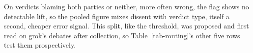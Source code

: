 On verdicts blaming both parties or neither, more often wrong, the flag shows no
detectable lift,
 so the pooled figure mixes dissent with verdict
type, itself a second, cheaper error signal. This split, like the
threshold, was proposed and first read on grok's debates after
collection, so Table~\ref{tab-routing}'s other five rows test them
prospectively.
